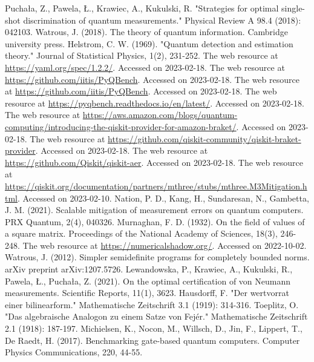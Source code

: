 \documentclass[preprint,12pt, a4paper, dvipsnames]{elsarticle}
\newcommand{\1}{{\rm 1\hspace{-0.9mm}l}}
\theoremstyle{definition}
\begin{document}
\begin{thebibliography}{00}
 Puchała, Z.,  Pawela, Ł.,  Krawiec, A.,  Kukulski, R. "Strategies for
optimal single-shot discrimination of quantum measurements." Physical Review A
98.4 (2018): 042103.
 Watrous, J. (2018). The theory of quantum information. Cambridge university press.
 Helstrom, C. W. (1969). "Quantum detection and estimation theory." Journal of Statistical Physics, 1(2), 231-252.
 The web resource at \url{https://yaml.org/spec/1.2.2/}. Accessed on 2023-02-18.
 The web resource at \url{https://github.com/iitis/PyQBench}. Accessed on 2023-02-18.
 The web resource at \url{https://github.com/iitis/PyQBench}. Accessed on 2023-02-18.
 The web resource at \url{https://pyqbench.readthedocs.io/en/latest/}. Accessed on 2023-02-18.
 The web resource at \url{https://aws.amazon.com/blogs/quantum-computing/introducing-the-qiskit-provider-for-amazon-braket/}. Accessed on 2023-02-18.
 The web resource at \url{https://github.com/qiskit-community/qiskit-braket-provider}. Accessed on 2023-02-18.
 The web resource at \url{https://github.com/Qiskit/qiskit-aer}. Accessed on 2023-02-18.
 The web resource at \url{https://qiskit.org/documentation/partners/mthree/stubs/mthree.M3Mitigation.html}. Accessed on 2023-02-10.
 Nation, P. D., Kang, H., Sundaresan, N.,  Gambetta, J. M. (2021). Scalable mitigation of measurement errors on quantum computers. PRX Quantum, 2(4), 040326.
 Murnaghan, F. D. (1932). On the field of values of a square matrix. Proceedings of the National Academy of Sciences, 18(3), 246-248.
 The web resource at \url{https://numericalshadow.org/}. Accessed on 2022-10-02.
 Watrous, J. (2012). Simpler semidefinite programs for completely bounded norms. arXiv preprint arXiv:1207.5726.
 Lewandowska, P., Krawiec, A., Kukulski, R., Pawela, Ł.,  Puchała, Z. (2021). On the optimal certification of von Neumann measurements. Scientific Reports, 11(1), 3623.
 Hausdorff, F. "Der wertvorrat einer bilinearform." Mathematische Zeitschrift 3.1 (1919): 314-316.
 Toeplitz, O. "Das algebraische Analogon zu einem Satze von Fejér." Mathematische Zeitschrift 2.1 (1918): 187-197.
 Michielsen, K., Nocon, M., Willsch, D., Jin, F., Lippert, T.,  De Raedt, H. (2017). Benchmarking gate-based quantum computers. Computer Physics Communications, 220, 44-55.

\end{thebibliography}
\end{document}
